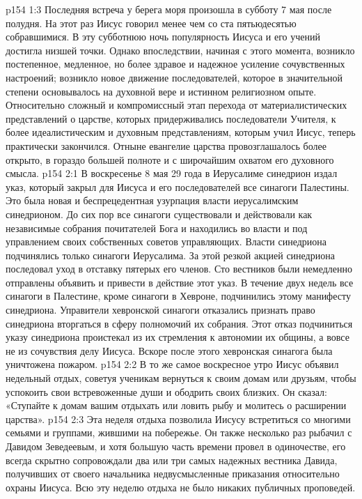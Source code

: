 \vs p154 1:3 Последняя встреча у берега моря произошла в субботу 7 мая после полудня. На этот раз Иисус говорил менее чем со ста пятьюдесятью собравшимися. В эту субботнюю ночь популярность Иисуса и его учений достигла низшей точки. Однако впоследствии, начиная с этого момента, возникло постепенное, медленное, но более здравое и надежное усиление сочувственных настроений; возникло новое движение последователей, которое в значительной степени основывалось на духовной вере и истинном религиозном опыте. Относительно сложный и компромиссный этап перехода от материалистических представлений о царстве, которых придерживались последователи Учителя, к более идеалистическим и духовным представлениям, которым учил Иисус, теперь практически закончился. Отныне евангелие царства провозглашалось более открыто, в гораздо большей полноте и с широчайшим охватом его духовного смысла.
\vs p154 2:1 В воскресенье 8 мая 29 года в Иерусалиме синедрион издал указ, который закрыл для Иисуса и его последователей все синагоги Палестины. Это была новая и беспрецедентная узурпация власти иерусалимским синедрионом. До сих пор все синагоги существовали и действовали как независимые собрания почитателей Бога и находились во власти и под управлением своих собственных советов управляющих. Власти синедриона подчинялись только синагоги Иерусалима. За этой резкой акцией синедриона последовал уход в отставку пятерых его членов. Сто вестников были немедленно отправлены объявить и привести в действие этот указ. В течение двух недель все синагоги в Палестине, кроме синагоги в Хевроне, подчинились этому манифесту синедриона. Управители хевронской синагоги отказались признать право синедриона вторгаться в сферу полномочий их собрания. Этот отказ подчиниться указу синедриона проистекал из их стремления к автономии их общины, а вовсе не из сочувствия делу Иисуса. Вскоре после этого хевронская синагога была уничтожена пожаром.
\vs p154 2:2 \pc В то же самое воскресное утро Иисус объявил недельный отдых, советуя ученикам вернуться к своим домам или друзьям, чтобы успокоить свои встревоженные души и ободрить своих близких. Он сказал: «Ступайте к домам вашим отдыхать или ловить рыбу и молитесь о расширении царства».
\vs p154 2:3 Эта неделя отдыха позволила Иисусу встретиться со многими семьями и группами, жившими на побережье. Он также несколько раз рыбачил с Давидом Зеведеевым, и хотя большую часть времени провел в одиночестве, его всегда скрытно сопровождали два или три самых надежных вестника Давида, получивших от своего начальника недвусмысленные приказания относительно охраны Иисуса. Всю эту неделю отдыха не было никаких публичных проповедей.
